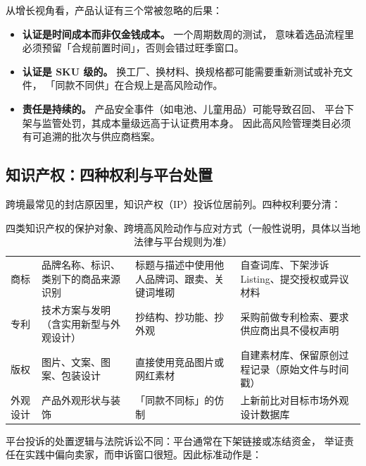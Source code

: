 从增长视角看，产品认证有三个常被忽略的后果：

\begin{itemize}
  \item \textbf{认证是时间成本而非仅金钱成本。} 一个周期数周的测试，
        意味着选品流程里必须预留「合规前置时间」，否则会错过旺季窗口。
  \item \textbf{认证是 SKU 级的。} 换工厂、换材料、换规格都可能需要重新测试或补充文件，
        「同款不同供」在合规上是高风险动作。
  \item \textbf{责任是持续的。} 产品安全事件（如电池、儿童用品）可能导致召回、
        平台下架与监管处罚，其成本量级远高于认证费用本身。
        因此高风险管理类目必须有可追溯的批次与供应商档案。
\end{itemize}

\subsection{知识产权：四种权利与平台处置}

跨境最常见的封店原因里，知识产权（IP）投诉位居前列。四种权利要分清：

\begin{table}[htbp]
\centering
\caption{四类知识产权的保护对象、跨境高风险动作与应对方式（一般性说明，具体以当地法律与平台规则为准）}
\label{tab:cbec-ip}
\small
\begin{tabularx}{\textwidth}{L{1.9cm} L{2.6cm} L{3.2cm} Y}
\toprule
{} &  &  &  \\
\midrule
商标 & 品牌名称、标识、类别下的商品来源识别 & 标题与描述中使用他人品牌词、跟卖、关键词堆砌 & 自查词库、下架涉诉 Listing、提交授权或异议材料 \\
\addlinespace
专利 & 技术方案与发明（含实用新型与外观设计） & 抄结构、抄功能、抄外观 & 采购前做专利检索、要求供应商出具不侵权声明 \\
\addlinespace
版权 & 图片、文案、图案、包装设计 & 直接使用竞品图片或网红素材 & 自建素材库、保留原创过程记录（原始文件与时间戳） \\
\addlinespace
外观设计 & 产品外观形状与装饰 & 「同款不同标」的仿制 & 上新前比对目标市场外观设计数据库 \\
\bottomrule
\end{tabularx}
\end{table}

平台投诉的处置逻辑与法院诉讼不同：平台通常在下架链接或冻结资金，
举证责任在实践中偏向卖家，而申诉窗口很短。因此标准动作是：

